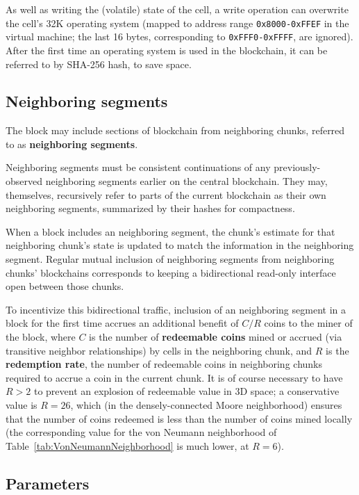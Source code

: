 \documentclass{article}
\newcommand\hex[1]{{\tt 0x#1}}
\newcommand\hexrange[2]{\hex{#1}{\tt -}\hex{#2}}
\begin{document}
As well as writing the (volatile) state of the cell, a write operation can overwrite the cell's 32K operating system
(mapped to address range \hexrange{8000}{FFEF} in the virtual machine; the last 16 bytes, corresponding to \hexrange{FFF0}{FFFF}, are ignored).
After the first time an operating system is used in the blockchain, it can be referred to by SHA-256 hash, to save space.

\subsection{Neighboring segments}
\label{sec:NeighboringSegments}

The block may include sections of blockchain from neighboring chunks,
referred to as {\bf neighboring segments}.

Neighboring segments must be consistent continuations of any previously-observed neighboring segments
earlier on the central blockchain.
They may, themselves, recursively refer to parts of the current blockchain as their own neighboring segments,
summarized by their hashes for compactness.

When a block includes an neighboring segment, the chunk's estimate for that neighboring chunk's state is updated to match the information in the neighboring segment.
Regular mutual inclusion of neighboring segments from neighboring chunks' blockchains
corresponds to keeping a bidirectional read-only interface open between those chunks.

To incentivize this bidirectional traffic,
inclusion of an neighboring segment in a block for the first time
accrues an additional benefit of $C/R$ coins to the miner of the block,
where $C$ is the number of {\bf redeemable coins} mined or accrued (via transitive neighbor relationships)
by cells in the neighboring chunk,
and $R$ is the {\bf redemption rate}, the number of redeemable coins in neighboring chunks
required to accrue a coin in the current chunk.
It is of course necessary to have $R>2$ to prevent an explosion of redeemable value in 3D space;
a conservative value is $R=26$, which (in the densely-connected Moore neighborhood)
ensures that the number of coins redeemed is less than the number of coins mined locally
(the corresponding value for the von Neumann neighborhood of Table~\ref{tab:VonNeumannNeighborhood}
is much lower, at $R=6$).

\subsection{Parameters}
\end{document}
